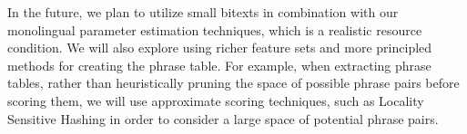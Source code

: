 \documentclass[11pt]{article}
\newcommand{\secref}[1]{Section~\ref{#1}}
\begin{document}

In the future, we plan to utilize small bitexts in combination with our monolingual parameter estimation techniques, which is a realistic resource condition. We will also explore using richer feature sets and more principled methods for creating the phrase table. For example, when extracting phrase tables, rather than heuristically pruning the space of possible phrase pairs before scoring them, we will use approximate scoring techniques, such as Locality Sensitive Hashing \cite{Charikar2002,VanDurme2010} in order to consider a large space of potential phrase pairs.



\end{document}
